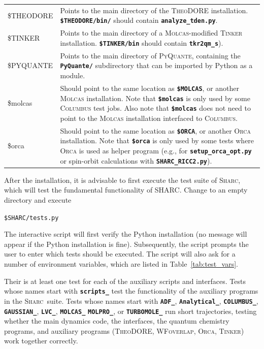 \documentclass[a4paper,10pt,DIV=15,openany]{scrbook}
\newcommand{\sharc}{\textsc{Sharc}}
\newcommand{\ttt}[1]{\textbf{\texttt{#1}}}
\newenvironment{example}{
  \setlength{\OuterFrameSep}{3pt}
  \vspace{0mm}
  \definecolor{shadecolor}{HTML}{E4F4FF}
  \begin{shaded}
}{
  \end{shaded}
}
\begin{document}
\begin{table}[tb]
\begin{tabular}{>{\ttfamily}lp{13cm}}
  \$THEODORE    &Points to the main directory of the \textsc{TheoDORE} installation. \ttt{\$THEODORE/bin/} should contain \ttt{analyze\_tden.py}.\\
  \$TINKER      &Points to the main directory of a \textsc{Molcas}-modified \textsc{Tinker} installation. \ttt{\$TINKER/bin} should contain \ttt{tkr2qm\_s}).\\
  \$PYQUANTE    &Points to the main directory of \textsc{PyQuante}, containing the \ttt{PyQuante/} subdirectory that can be imported by Python as a module.\\
  \$molcas      &Should point to the same location as \ttt{\$MOLCAS}, or another \textsc{Molcas} installation. Note that \ttt{\$molcas} is only used by some \textsc{Columbus} test jobs. Also note that \ttt{\$molcas} does not need to point to the \textsc{Molcas} installation interfaced to \textsc{Columbus}.\\
  \$orca        &Should point to the same location as \ttt{\$ORCA}, or another \textsc{Orca} installation. Note that \ttt{\$orca} is only used by some tests where \textsc{Orca} is used as helper program (e.g., for \ttt{setup\_orca\_opt.py} or spin-orbit calculations with \ttt{SHARC\_RICC2.py}).\\
  \hline
  \end{tabular}
\end{table}


After the installation, it is advisable to first execute the test suite of \sharc, which will test the fundamental functionality of SHARC.
Change to an empty directory and execute
\begin{example}
\verb|$SHARC/tests.py|
\end{example}
The interactive script will first verify the Python installation (no message will appear if the Python installation is fine). 
Subsequently, the script prompts the user to enter which tests should be executed. 
The script will also ask for a number of environment variables, which are listed in Table~\ref{tab:test_vars}.

Their is at least one test for each of the auxiliary scripts and interfaces. 
Tests whose names start with \ttt{scripts\_} test the functionality of the auxiliary programs in the \sharc\ suite.
Tests whose names start with \ttt{ADF\_}, \ttt{Analytical\_}, \ttt{COLUMBUS\_}, \ttt{GAUSSIAN\_}, \ttt{LVC\_}, \ttt{MOLCAS\_} \ttt{MOLPRO\_}, or \ttt{TURBOMOLE\_} run short trajectories, testing whether the main dynamics code, the interfaces, the quantum chemistry programs, and auxiliary programs (\textsc{TheoDORE}, \textsc{WFoverlap}, \textsc{Orca}, \textsc{Tinker}) work together correctly.
\end{document}
